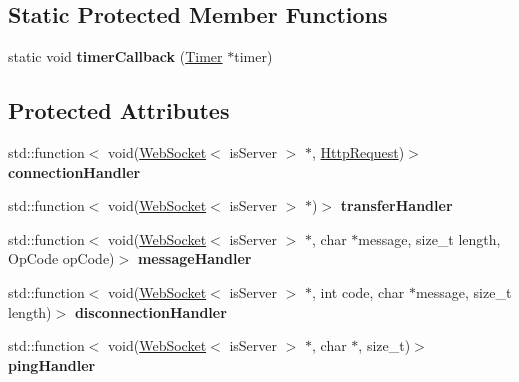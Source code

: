 \subsection*{Static Protected Member Functions}
\begin{DoxyCompactItemize}
\item 
\mbox{\label{structu_w_s_1_1_group_aebe40fdb6e9d9faa33ca49e5d9c37a75}} 
static void {\bfseries timer\+Callback} (\mbox{\hyperlink{struct_timer}{Timer}} $\ast$timer)
\end{DoxyCompactItemize}
\subsection*{Protected Attributes}
\begin{DoxyCompactItemize}
\item 
\mbox{\label{structu_w_s_1_1_group_af0698cea43e2764c291041765689c90a}} 
std\+::function$<$ void(\mbox{\hyperlink{structu_w_s_1_1_web_socket}{Web\+Socket}}$<$ is\+Server $>$ $\ast$, \mbox{\hyperlink{structu_w_s_1_1_http_request}{Http\+Request}})$>$ {\bfseries connection\+Handler}
\item 
\mbox{\label{structu_w_s_1_1_group_a1f107c5f5520f3a48c935ff3dc1b6b52}} 
std\+::function$<$ void(\mbox{\hyperlink{structu_w_s_1_1_web_socket}{Web\+Socket}}$<$ is\+Server $>$ $\ast$)$>$ {\bfseries transfer\+Handler}
\item 
\mbox{\label{structu_w_s_1_1_group_adf5c6a07e73f1d5777a0a4f1a539ec04}} 
std\+::function$<$ void(\mbox{\hyperlink{structu_w_s_1_1_web_socket}{Web\+Socket}}$<$ is\+Server $>$ $\ast$, char $\ast$message, size\+\_\+t length, Op\+Code op\+Code)$>$ {\bfseries message\+Handler}
\item 
\mbox{\label{structu_w_s_1_1_group_ae3f6ed1781dbb11093095fa939d3055f}} 
std\+::function$<$ void(\mbox{\hyperlink{structu_w_s_1_1_web_socket}{Web\+Socket}}$<$ is\+Server $>$ $\ast$, int code, char $\ast$message, size\+\_\+t length)$>$ {\bfseries disconnection\+Handler}
\item 
\mbox{\label{structu_w_s_1_1_group_a2d6d5d0778bb23e495fa91c6e98b5a87}} 
std\+::function$<$ void(\mbox{\hyperlink{structu_w_s_1_1_web_socket}{Web\+Socket}}$<$ is\+Server $>$ $\ast$, char $\ast$, size\+\_\+t)$>$ {\bfseries ping\+Handler}

\end{DoxyCompactItemize}
